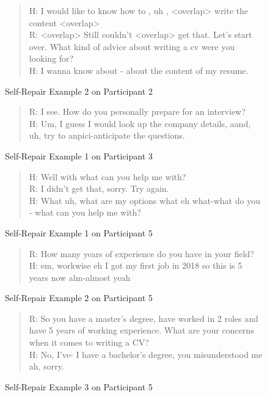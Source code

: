 \documentclass[11pt]{article}
\begin{document}
\begin{figure}[!h]
\begin{quote}
H: I would like to know how to , uh , <overlap> write the content <overlap>\\
R: <overlap> Still couldn't <overlap> get that. Let's start over. What kind of advice about writing a cv were you looking for? \\
H: I wanna know about - about the content of my resume.
\caption{Self-Repair Example 2 on Participant 2}
\label{selfrepair_22}
\end{quote}
\end{figure}


\begin{figure}[!h]
\begin{quote}
R: I see. How do you personally prepare for an interview?\\
H: Um, I guess I would look up the company details, aand, uh, try to anpici-anticipate the questions.
\caption{Self-Repair Example 1 on Participant 3}
\label{selfrepair_13}
\end{quote}
\end{figure}


\begin{figure}[!h]
\begin{quote}
	H: Well with what can you help me with?\\
	R: I didn't get that, sorry. Try again.\\
	H: What uh, what are my options what eh what-what do you - what can you help me with?  
\caption{Self-Repair Example 1 on Participant 5}
\label{selfrepair_15}
\end{quote}
\end{figure}

\begin{figure}[!h]
\begin{quote}
R: How many years of experience do you have in your field?\\
H: em, workwise eh I got my first job in 2018 so this is 5 years now alm-almost yeah
	\caption{Self-Repair Example 2 on Participant 5}
	\label{selfrepair_25}
\end{quote}
\end{figure}

\begin{figure}[!h]
\begin{quote}
	R: So you have a master's degree, have worked in 2 roles and have 5 years of working experience. What are your concerns when it comes to writing a CV?\\
	H: No, I've- I have a bachelor's degree, you misunderstood me ah, sorry. 
	
	\caption{Self-Repair Example 3 on Participant 5}
	\label{selfrepair_35}
\end{quote}
\end{figure}
\end{document}

